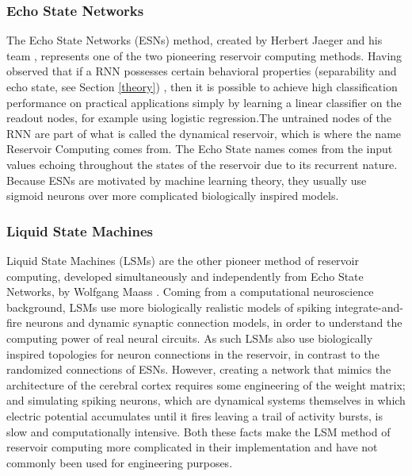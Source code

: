 \documentclass[12pt,oneside]{CUNY_CS_PhD}
\begin{document}
\subsubsection{Echo State Networks}
The Echo State Networks (ESNs) method, created by Herbert Jaeger and his team \cite{jaeger_echo_2001}, represents one of the two pioneering reservoir computing methods. Having observed that if a RNN possesses certain behavioral properties (separability and echo state, see Section \ref{theory}) ,
 then it is possible to achieve high classification performance on practical applications simply by learning a linear classifier on the readout nodes, for example using logistic regression.The untrained nodes of the RNN are part of what is called the dynamical reservoir, which is where the name Reservoir Computing comes from. The Echo State names comes from the input values echoing throughout the states of the reservoir due to its recurrent nature. Because ESNs are motivated by machine learning theory, they usually use sigmoid neurons over more complicated biologically inspired models.

\subsubsection{Liquid State Machines}
Liquid State Machines (LSMs) are the other pioneer method of reservoir computing, developed simultaneously and independently from Echo State Networks, by Wolfgang Maass \cite{Natschlager2002}. Coming from a computational neuroscience background, LSMs use more biologically realistic models of spiking integrate-and-fire neurons and dynamic synaptic connection models,
 in order to understand the computing power of real neural circuits. As such LSMs also use biologically inspired topologies for neuron connections in the reservoir, in contrast to the randomized connections of ESNs. However, creating a network that mimics the architecture of the cerebral cortex requires some engineering of the weight matrix; and simulating spiking neurons, which are dynamical systems themselves in which electric potential accumulates until it fires leaving a trail of activity bursts, is slow and computationally intensive. Both these facts make the LSM method of reservoir computing more complicated in their implementation  and have not commonly been used for engineering purposes.  
\end{document}
